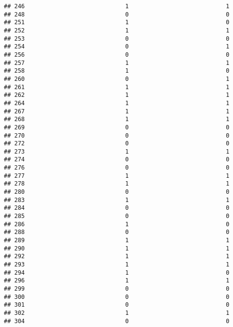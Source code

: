 \documentclass[
]{article}
\begin{document}
\begin{verbatim}
## 246                             1                            1
## 248                             0                            0
## 251                             1                            0
## 252                             1                            1
## 253                             0                            0
## 254                             0                            1
## 256                             0                            0
## 257                             1                            1
## 258                             1                            0
## 260                             0                            1
## 261                             1                            1
## 262                             1                            1
## 264                             1                            1
## 267                             1                            1
## 268                             1                            1
## 269                             0                            0
## 270                             0                            0
## 272                             0                            0
## 273                             1                            1
## 274                             0                            0
## 276                             0                            0
## 277                             1                            1
## 278                             1                            1
## 280                             0                            0
## 283                             1                            1
## 284                             0                            0
## 285                             0                            0
## 286                             1                            0
## 288                             0                            0
## 289                             1                            1
## 290                             1                            1
## 292                             1                            1
## 293                             1                            1
## 294                             1                            0
## 296                             1                            1
## 299                             0                            0
## 300                             0                            0
## 301                             0                            0
## 302                             1                            1
## 304                             0                            0

\end{verbatim}
\end{document}
